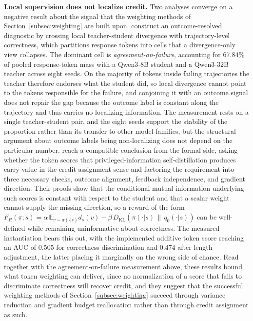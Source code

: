 \documentclass{article} %
\newcommand{\E}{\mathbb{E}}
\begin{document}
\textbf{Local supervision does not localize credit.} Two analyses converge on a negative result about the signal that the weighting methods of Section~\ref{subsec:weighting} are built upon. \citet{2607.23731} construct an outcome-resolved diagnostic by crossing local teacher-student divergence with trajectory-level correctness, which partitions response tokens into cells that a divergence-only view collapses. The dominant cell is \emph{agreement-on-failure}, accounting for $67.84\%$ of pooled response-token mass with a Qwen3-8B student and a Qwen3-32B teacher across eight seeds. On the majority of tokens inside failing trajectories the teacher therefore endorses what the student did, so local divergence cannot point to the tokens responsible for the failure, and conjoining it with an outcome signal does not repair the gap because the outcome label is constant along the trajectory and thus carries no localizing information. The measurement rests on a single teacher-student pair, and the eight seeds support the stability of the proportion rather than its transfer to other model families, but the structural argument about outcome labels being non-localizing does not depend on the particular number. \citet{2608.09263} reach a compatible conclusion from the formal side, asking whether the token scores that privileged-information self-distillation produces carry value in the credit-assignment sense and factoring the requirement into three necessary checks, outcome alignment, feedback independence, and gradient direction. Their proofs show that the conditional mutual information underlying such scores is constant with respect to the student and that a scalar weight cannot supply the missing direction, so a reward of the form $F_R(\pi;s) = \alpha\,\E_{v \sim \pi(\cdot|s)} d_s(v) - \beta\,D_{\mathrm{KL}}(\pi(\cdot|s) \,\|\, q_0(\cdot|s))$ can be well-defined while remaining uninformative about correctness. The measured instantiation bears this out, with the implemented additive token score reaching an AUC of $0.505$ for correctness discrimination and $0.474$ after length adjustment, the latter placing it marginally on the wrong side of chance. Read together with the agreement-on-failure measurement above, these results bound what token weighting can deliver, since no normalization of a score that fails to discriminate correctness will recover credit, and they suggest that the successful weighting methods of Section~\ref{subsec:weighting} succeed through variance reduction and gradient budget reallocation rather than through credit assignment as such.
\end{document}
